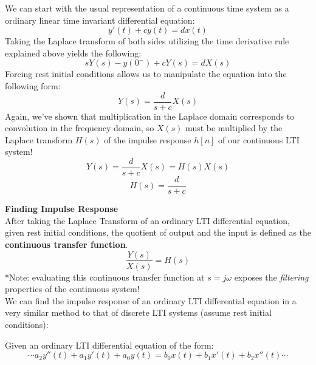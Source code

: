 \documentclass[a4paper]{article}
\numberwithin{equation}{section}
\begin{document}
We can start with the usual representation of a continuous time system as a ordinary linear time invariant differential equation:
\begin{equation}
y'(t) + cy(t)=dx(t)
\end{equation}
Taking the Laplace transform of both sides utilizing the time derivative rule explained above yields the following:
\begin{equation}
sY(s)-y(0^-)+cY(s)=dX(s)
\end{equation}
Forcing rest initial conditions allows us to manipulate the equation into the following form:
\begin{equation}
Y(s)=\frac{d}{s+c}X(s)
\end{equation}
Again, we've shown that multiplication in the Laplace domain corresponds to convolution in the frequency domain, so $X(s)$ must be multiplied by the Laplace transform $H(s)$ of the impulse response $h[n]$ of our continuous LTI system!
\begin{equation}
Y(s)=\frac{d}{s+c}X(s)=H(s)X(s)
\end{equation}
\begin{equation}
H(s)=\frac{d}{s+c}
\end{equation}

\textbf{Finding Impulse Response}\\

After taking the Laplace Transform of an ordinary LTI differential equation, given rest initial conditions, the quotient of output and the input is defined as the \textbf{continuous transfer function}.
\begin{equation}
\frac{Y(s)}{X(s)}=H(s)
\end{equation}
*Note: evaluating this continuous transfer function at $s=j\omega$ exposes the \textit{filtering} properties of the continuous system!\\

We can find the impulse response of an ordinary LTI differential equation in a very similar method to that of discrete LTI systems (assume rest initial conditions):

Given an ordinary LTI differential equation of the form:
\begin{equation}
\cdots a_2y''(t)+a_1y'(t)+a_0y(t)=b_0x(t)+b_1x'(t)+b_2x''(t) \cdots
\end{equation}
\end{document}
